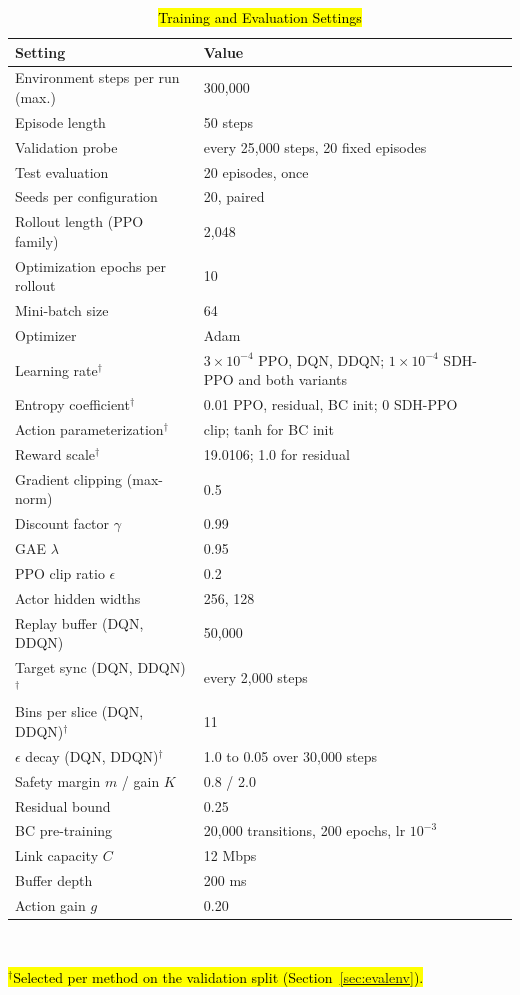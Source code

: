 \documentclass[conference]{IEEEtran}
\newcommand{\rev}[1]{\hl{#1}}
\newcommand{\revhdr}{\rowcolor{yellow!45}}
\begin{document}
\begin{table}[htbp]
\centering
\caption{\rev{Training and Evaluation Settings}}
\label{tab:2}
\footnotesize
\begin{tabular}{p{3.6cm}p{4.2cm}}
\toprule
\revhdr Setting & Value \\
\midrule
Environment steps per run (max.) & 300{,}000 \\
Episode length & 50 steps \\
Validation probe & every 25{,}000 steps, 20 fixed episodes \\
Test evaluation & 20 episodes, once \\
Seeds per configuration & 20, paired \\
Rollout length (PPO family) & 2{,}048 \\
Optimization epochs per rollout & 10 \\
Mini-batch size & 64 \\
Optimizer & Adam \\
Learning rate$^\dagger$ & $3{\times}10^{-4}$ PPO, DQN, DDQN; $1{\times}10^{-4}$ SDH-PPO and both variants \\
Entropy coefficient$^\dagger$ & 0.01 PPO, residual, BC init; 0 SDH-PPO \\
Action parameterization$^\dagger$ & clip; tanh for BC init \\
Reward scale$^\dagger$ & 19.0106; 1.0 for residual \\
Gradient clipping (max-norm) & 0.5 \\
Discount factor $\gamma$ & 0.99 \\
GAE $\lambda$ & 0.95 \\
PPO clip ratio $\epsilon$ & 0.2 \\
Actor hidden widths & 256, 128 \\
Replay buffer (DQN, DDQN) & 50{,}000 \\
Target sync (DQN, DDQN)$^\dagger$ & every 2{,}000 steps \\
Bins per slice (DQN, DDQN)$^\dagger$ & 11 \\
$\epsilon$ decay (DQN, DDQN)$^\dagger$ & 1.0 to 0.05 over 30{,}000 steps \\
Safety margin $m$ / gain $K$ & 0.8 / 2.0 \\
Residual bound & 0.25 \\
BC pre-training & 20{,}000 transitions, 200 epochs, lr $10^{-3}$ \\
Link capacity $C$ & 12 Mbps \\
Buffer depth & 200 ms \\
Action gain $g$ & 0.20 \\
\bottomrule
\end{tabular}
\\[2pt]
\parbox{\columnwidth}{\footnotesize \rev{$^\dagger$Selected per method on the validation split (Section~\ref{sec:evalenv}).}}
\end{table}
\end{document}
